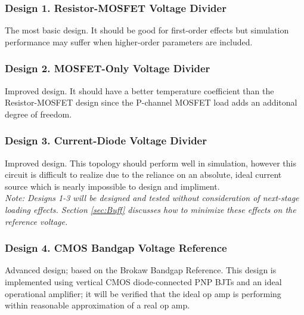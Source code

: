 \documentclass[conference]{IEEEtran}
\newcommand{\tab}{\hspace*{2em}}
\begin{document}
\subsubsection{Design 1. Resistor-MOSFET Voltage Divider}
The most basic design.  It should be good for first-order effects but simulation performance may suffer when higher-order parameters are included.
\subsubsection{Design 2. MOSFET-Only Voltage Divider}
Improved design.  It should have a better temperature coefficient than the Resistor-MOSFET design since the P-channel MOSFET load adds an additonal degree of freedom.
\subsubsection{Design 3. Current-Diode Voltage Divider}
Improved design.  This topology should perform well in simulation, however this circuit is difficult to realize due to the reliance on an absolute, ideal current source which is nearly impossible to design and impliment.\\
\tab\emph{Note: Designs 1-3 will be designed and tested without consideration of next-stage loading effects.  Section \ref{sec:Buff} discusses how to minimize these effects on the reference voltage.}
\subsubsection{Design 4. CMOS Bandgap Voltage Reference}
Advanced design; based on the Brokaw Bandgap Reference.  This design is implemented using vertical CMOS diode-connected PNP BJTs and an ideal operational amplifier; it will be verified that the ideal op amp is performing within reasonable approximation of a real op amp.
\end{document}
